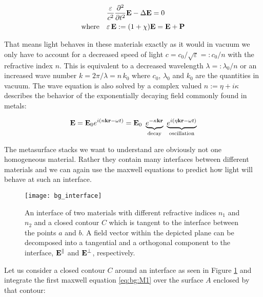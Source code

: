 \begin{equation}
\begin{aligned}
    &\frac{\varepsilon}{c^2} \pdv[2] t \vb E - \Delta \vb E = 0\\
    \qq*{where} &\varepsilon \, \vb E := \qty(1 + \chi) \vb E = \vb E + \vb P
\end{aligned}
\end{equation}

That means light behaves in these materials exactly as it would in vacuum we only have to account for a decreased speed of light
$c = {c_0} / {\sqrt{\varepsilon}} =: {c_0} / {n}$
with the refractive index $n$.
This is equivalent to a decreased wavelength
$\lambda =: {\lambda_0} / {n}$
or an increased wave number
$k = {2 \pi} / {\lambda} = n \, k_0$
where $c_0$, $\lambda_0$ and $k_0$ are the quantities in vacuum.
The wave equation is also solved by a complex valued $n := \eta + i \kappa$ describes the behavior of the exponentially decaying field commonly found in metals:

\begin{equation}
    \vb E = \vb E_0 e^{i(n \vb k \vb r - \omega t)}
    = \vb E_0 \
    \underbrace{e^{-\kappa \vb k \vb r}}_{\mathrm{
    decay}} \
    \underbrace{e^{i(\eta \vb k \vb r - \omega t)}}_{\mathrm{
    oscillation}}
\end{equation}

The metasurface stacks we want to understand are obviously not one homogeneous material. Rather they contain many interfaces between different materials and we can again use the maxwell equations to predict how light will behave at such an interface.
\\

\begin{figure}[H]
    \centering
    \texttt{[image: bg\_interface]}
    \caption{An interface of two materials with different refractive indices $n_1$ and $n_2$ and a closed contour $C$ which is tangent to the interface between the points $a$ and $b$. A field vector within the depicted plane can be decomposed into a tangential and a orthogonal component to the interface, 
    $\vb E^\parallel$ and $\vb E^\bot$, respectively.}
    \label{fig:bg:interface}
\end{figure}

Let us consider a closed contour $C$ around an interface as seen in Figure \ref{fig:bg:interface} and integrate the first maxwell equation \eqref{eq:bg:M1} over the surface $A$ enclosed by that contour:

